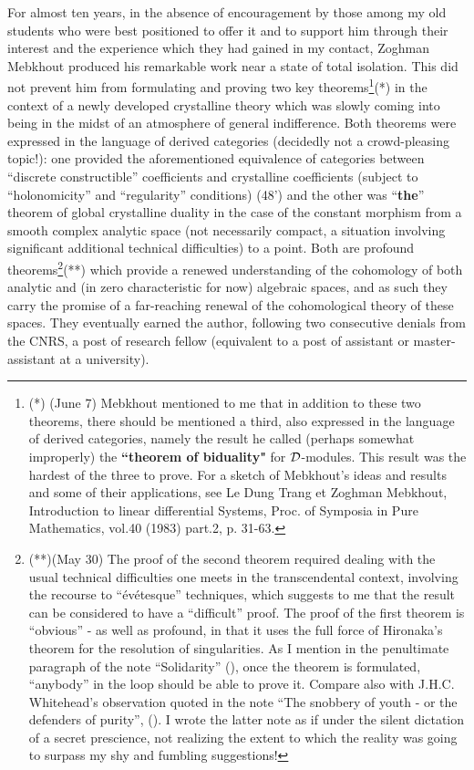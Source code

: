 For almost ten years, in the absence of encouragement by those among my old students
who were best positioned to offer it and to support him through their interest and the
experience which they had gained in my contact,
Zoghman Mebkhout produced his remarkable work near a state of total isolation. 
This did not prevent him from formulating and proving two key theorems\footnote{(*) (June
7) Mebkhout mentioned to me that in addition to these two theorems, there should be
mentioned a third, also expressed in the language of derived categories, namely the result he called (perhaps somewhat improperly) the \textbf{``theorem of biduality"} for $\mathcal{D}$-modules. This result
was the hardest of the three to prove. For a sketch of Mebkhout's ideas and results and some of
their applications, see
Le Dung Trang et Zoghman Mebkhout, Introduction to linear differential Systems, Proc. of
Symposia in Pure Mathematics, vol.40 (1983) part.2, p. 31-63.
}(*)
in the context of a
newly developed crystalline theory which was slowly coming into being 
in the midst of an atmosphere of general indifference.
Both theorems
were expressed in the language of derived categories
(decidedly not a crowd-pleasing topic!): one provided the aforementioned equivalence of categories between ``discrete constructible'' coefficients and crystalline coefficients
(subject to ``holonomicity'' and ``regularity'' conditions) (48')
and the other was ``\textbf{the}'' theorem of global crystalline duality in the case of the constant morphism
from a smooth complex analytic space (not necessarily compact, a situation involving significant
additional technical difficulties) to a point.
Both are profound theorems\footnote{(**)(May 30) The proof of the second theorem
required dealing with the usual technical difficulties one meets in the transcendental context,
involving the recourse to ``\'ev\'etesque'' techniques, which suggests to me that the result can be considered to have a
``difficult'' proof. The proof of the first theorem is ``obvious'' - as well as profound,
in that it uses the full force of
Hironaka's theorem for the resolution of singularities. As I mention in the penultimate
paragraph of the note ``Solidarity'' (), once the theorem is formulated, 
``anybody'' in the loop should be able to prove it. Compare also with J.H.C. Whitehead's
observation quoted in the
note ``The snobbery of youth - or the defenders of purity'', ().
I wrote the latter note as if under the silent dictation of a secret prescience,
not realizing the extent to which the reality was going to surpass my shy and fumbling
suggestions!}(**)
which provide a renewed 
understanding of the cohomology of both analytic and
(in zero characteristic for now) algebraic spaces, and as such they carry the promise of a
far-reaching renewal of the cohomological theory of these spaces.
They eventually earned the author, following two consecutive denials from the CNRS, a post of research fellow
(equivalent to a post of assistant or master-assistant at a university).

